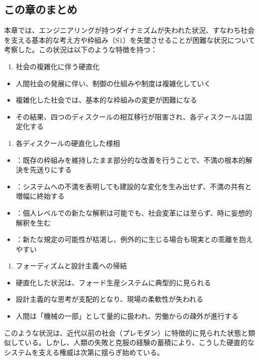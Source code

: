 \subsection{この章のまとめ}\label{ux3053ux306eux7ae0ux306eux307eux3068ux3081}

本章では、エンジニアリングが持つダイナミズムが失われた状況、すなわち社会を支える基本的な考え方や枠組み（\(\textrm{S}1\)）を失墜させることが困難な状況について考察した。この状況は以下のような特徴を持つ：

\begin{enumerate}
\def\labelenumi{\arabic{enumi}.}
\tightlist
\item
  社会の複雑化に伴う硬直化
\end{enumerate}

\begin{itemize}
\tightlist
\item
  人間社会の発展に伴い、制御の仕組みや制度は複雑化していく
\item
  複雑化した社会では、基本的な枠組みの変更が困難になる
\item
  その結果、四つのディスクールの相互移行が阻害され、各ディスクールは固定化する
\end{itemize}

\begin{enumerate}
\def\labelenumi{\arabic{enumi}.}
\setcounter{enumi}{1}
\tightlist
\item
  各ディスクールの硬直化した様相
\end{enumerate}

\begin{itemize}
\tightlist
\item
  ：既存の枠組みを維持したまま部分的な改善を行うことで、不満の根本的解決を先送りにする
\item
  ：システムへの不満を表明しても建設的な変化を生み出せず、不満の共有と増幅に終始する
\item
  ：個人レベルでの新たな解釈は可能でも、社会変革には至らず、時に妄想的解釈を生む
\item
  ：新たな規定の可能性が枯渇し、例外的に生じる場合も現実との乖離を抱えやすい
\end{itemize}

\begin{enumerate}
\def\labelenumi{\arabic{enumi}.}
\setcounter{enumi}{2}
\tightlist
\item
  フォーディズムと設計主義への帰結
\end{enumerate}

\begin{itemize}
\tightlist
\item
  硬直化した状況は、フォード生産システムに典型的に見られる
\item
  設計主義的な思考が支配的となり、現場の柔軟性が失われる
\item
  人間は「機械の一部」として量的に扱われ、労働からの疎外が進行する
\end{itemize}

このような状況は、近代以前の社会（プレモダン）に特徴的に見られた状態と類似している。しかし、人類の失敗と克服の経験の蓄積により、こうした硬直的なシステムを支える権威は次第に揺らぎ始めている。
